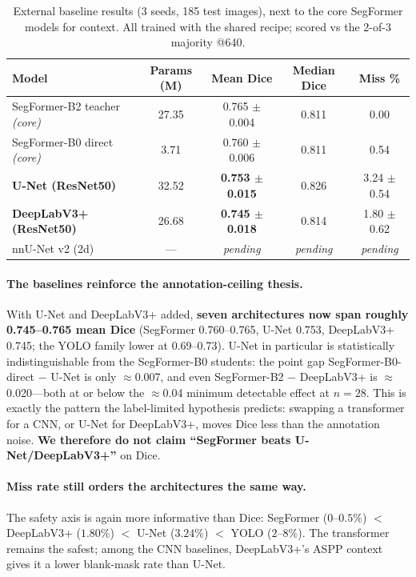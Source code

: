 \documentclass[11pt]{article}
\newcommand{\best}[1]{\textbf{#1}}
\begin{document}
\begin{table}[h]
\centering
\caption{External baseline results (3 seeds, 185 test images), next to the core SegFormer
models for context. All trained with the shared recipe; scored vs the 2-of-3 majority @640.}
\label{tab:baselines}
\begin{tabular}{lcccc}
\toprule
Model & Params (M) & Mean Dice & Median Dice & Miss \% \\
\midrule
SegFormer-B2 teacher \emph{(core)}    & 27.35 & 0.765 $\pm$ 0.004 & 0.811 & 0.00 \\
SegFormer-B0 direct \emph{(core)}     & 3.71  & 0.760 $\pm$ 0.006 & 0.811 & 0.54 \\
\midrule
\textbf{U-Net (ResNet50)}      & 32.52 & \best{0.753 $\pm$ 0.015} & 0.826 & 3.24 $\pm$ 0.54 \\
\textbf{DeepLabV3+ (ResNet50)} & 26.68 & \best{0.745 $\pm$ 0.018} & 0.814 & 1.80 $\pm$ 0.62 \\
nnU-Net v2 (2d)                & --- & \emph{pending} & \emph{pending} & \emph{pending} \\
\bottomrule
\end{tabular}
\end{table}

\paragraph{The baselines reinforce the annotation-ceiling thesis.} With U-Net and
DeepLabV3+ added, \textbf{seven architectures now span roughly 0.745--0.765 mean Dice}
(SegFormer 0.760--0.765, U-Net 0.753, DeepLabV3+ 0.745; the YOLO family lower at
0.69--0.73). U-Net in particular is statistically indistinguishable from the SegFormer-B0
students: the point gap SegFormer-B0-direct $-$ U-Net is only $\approx$0.007, and even
SegFormer-B2 $-$ DeepLabV3+ is $\approx$0.020---both at or below the $\approx$0.04 minimum
detectable effect at $n=28$. This is exactly the pattern the label-limited hypothesis
predicts: swapping a transformer for a CNN, or U-Net for DeepLabV3+, moves Dice less than
the annotation noise. \textbf{We therefore do not claim ``SegFormer beats U-Net/DeepLabV3+''}
on Dice.

\paragraph{Miss rate still orders the architectures the same way.} The safety axis is again
more informative than Dice: SegFormer ($0$--$0.5\%$) $<$ DeepLabV3+ ($1.80\%$) $<$ U-Net
($3.24\%$) $<$ YOLO ($2$--$8\%$). The transformer remains the safest; among the CNN
baselines, DeepLabV3+'s ASPP context gives it a lower blank-mask rate than U-Net.
\end{document}
